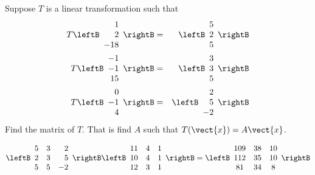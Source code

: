 \begin{enumialphparenastyle}
\begin{ex} Suppose $T$ is a linear transformation such that
\begin{eqnarray*}
T\leftB
\begin{array}{r}
1 \\
2 \\
-18
\end{array}
\rightB &=&\leftB
\begin{array}{r}
5 \\
2 \\
5
\end{array}
\rightB \\
T\leftB
\begin{array}{r}
-1 \\
-1 \\
15
\end{array}
\rightB &=&\leftB
\begin{array}{r}
3 \\
3 \\
5
\end{array}
\rightB \\
T\leftB
\begin{array}{r}
0 \\
-1 \\
4
\end{array}
\rightB &=&\leftB
\begin{array}{r}
2 \\
5 \\
-2
\end{array}
\rightB
\end{eqnarray*}
Find the matrix of $T$. That is find $A$ such that $T(\vect{x})=A\vect{x}$. \vspace{1mm}
\begin{sol}
\[
\leftB
\begin{array}{rrr}
5 & 3 & 2 \\
2 & 3 & 5 \\
5 & 5 & -2
\end{array}
\rightB \leftB
\begin{array}{ccc}
11 & 4 & 1 \\
10 & 4 & 1 \\
12 & 3 & 1
\end{array}
\rightB =\leftB
\begin{array}{ccc}
109 & 38 & 10 \\
112 & 35 & 10 \\
81 & 34 & 8
\end{array}
\rightB
\]
\end{sol}
\end{ex}



\end{enumialphparenastyle}
